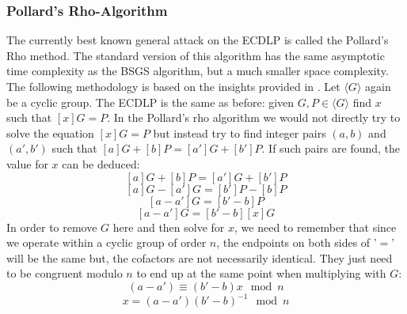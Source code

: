 \subsubsection{Pollard's Rho-Algorithm}
\label{subsubsection:pollardsrho}
The currently best known general attack on the ECDLP is called the Pollard's Rho method. The standard version of this algorithm has the same asymptotic time complexity as the BSGS algorithm, but a much smaller space complexity. 
The following methodology is based on  the insights provided in \cite{article}.
Let $\langle G \rangle$ again be a cyclic group. The ECDLP is the same as before: given $G, P \in \langle G \rangle$ find $x$ such that $[x]G = P$. In the Pollard's rho algorithm we would not directly try to solve the equation $[x]G = P$ but instead try to find integer pairs $(a, b)$ and $(a', b')$ such that $[a]G + [b]P = [a']G + [b']P$. If such pairs are found, the value for $x$ can be deduced:
$$[a]G + [b]P = [a']G + [b']P$$
$$[a]G - [a']G = [b']P - [b]P$$
$$[a - a']G = [b' - b]P$$
$$[a - a']G = [b' - b][x]G$$
In order to remove $G$ here and then solve for $x$, we need to remember that since we operate within a cyclic group of order $n$, the endpoints on both sides of '$=$' will be the same but, the cofactors are not necessarily identical. They just need to be congruent modulo $n$ to end up at the same point when multiplying with $G$:
$$(a - a') \equiv (b' - b)x \mod n$$
$$x = (a - a')(b' - b)^{-1} \mod n$$
